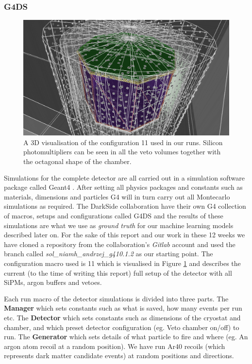 \documentclass[11pt]{article} %
\begin{document}
\subsubsection{G4DS}
\begin{figure}[H]
\centering
\includegraphics[scale=0.3]{images/config11.png}
\caption{A 3D visualisation of the configuration 11 used in our runs. Silicon photomultipliers can be seen in all the veto volumes together with the octagonal shape of the chamber.}
\label{fig:config11}
\end{figure}


Simulations for the complete detector are all carried out in a simulation software package called Geant4 \cite{G4}. After setting all physics packages and constants such as materials, dimensions and particles G4 will in turn carry out all Montecarlo simulations as required.
The DarkSide collaboration have their own G4 collection of macros, setups and configurations called G4DS and the results of these simulations are what we use as \textit{ground truth} for our machine learning models described later on. For the sake of this report and our work in these 12 weeks we have cloned a repository from the collaboration's \textit{Gitlab} account and used the branch called \textit{sol\_niamh\_andrzej\_g410.1.2} as our starting point.
The configuration macro used is 11 which is visualised in Figure \ref{fig:config11} and describes the current (to the time of writing this report) full setup of the detector with all SiPMs, argon buffers and vetoes.
\newline

Each run macro of the detector simulations is divided into three parts. The \textbf{Manager} which sets constants such as what is saved, how many events per run etc. The \textbf{Detector} which sets constants such as dimensions of the cryostat and chamber, and which preset detector configuration (eg. Veto chamber on/off) to run. The \textbf{Generator} which sets details of what particle to fire and where (eg. An argon atom recoil at a random position). We have run Ar40 recoils (which represents dark matter candidate events) at random positions and directions.
\newline
\end{document}
